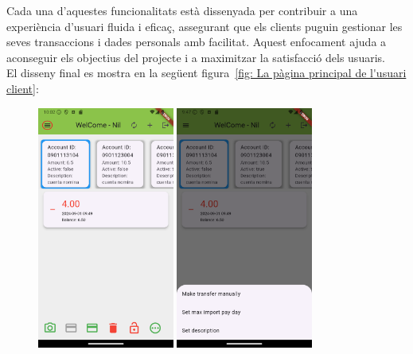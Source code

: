 \documentclass[a4paper,12pt,twoside]{ThesisStyle}
\begin{document}
Cada una d'aquestes funcionalitats està dissenyada per contribuir a una experiència d'usuari fluida i eficaç, assegurant que els clients puguin gestionar les seves transaccions i dades personals amb facilitat. Aquest enfocament ajuda a aconseguir els objectius del projecte i a maximitzar la satisfacció dels usuaris.\\

El disseny final es mostra en la següent figura~\ref{fig: La pàgina principal de l'usuari client}:


\begin{figure}[h]   
    \centering
    \includegraphics[width=0.4\textwidth]{imatges/main101.png}
    \includegraphics[width=0.4\textwidth]{imatges/client_others.png}

\end{figure}
\end{document}
